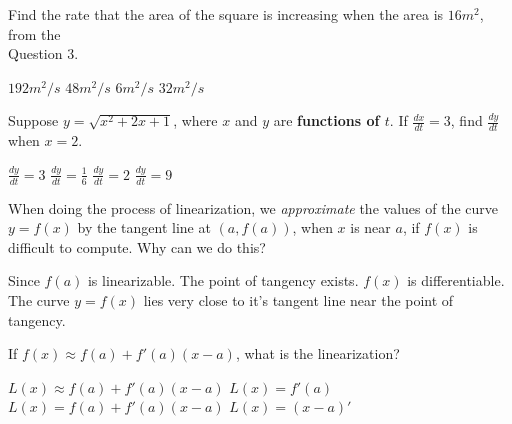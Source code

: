 \documentclass[addpoints, 12pt]{exam}%
\newcommand{\spc}{\vspace*{0.5cm}}
\begin{document}
\begin{questions}
Find the rate that the area of the square is increasing when the area is $16m^2$, from the \\Question 3.

\begin{multicols}{2}
\begin{choices}
\choice $192 m^2/s$
\CorrectChoice $48 m^2/s$
\choice $6 m^2/s$
\choice $32 m^2/s$
\end{choices}
\end{multicols}

\spc

\question[1]

Suppose $y = \sqrt{x^2 + 2x + 1}$, where $x$ and $y$ are \textbf{functions of $t$}. If $\frac{dx}{dt} = 3$, find $\frac{dy}{dt}$ when $x = 2$.

\begin{multicols}{2}
\begin{choices}
\CorrectChoice $\frac{dy}{dt} = 3$
\choice $\frac{dy}{dt} = \frac{1}{6}$
\choice $\frac{dy}{dt} = 2$
\choice $\frac{dy}{dt} = 9$
\end{choices}
\end{multicols}

\spc

\question[1]

When doing the process of linearization, we \textit{approximate} the values of the curve $y = f(x)$ by the tangent line at $(a, f(a))$, when $x$ is near $a$, if $f(x)$ is difficult to compute. Why can we do this?

\begin{choices}
\choice Since $f(a)$ is linearizable.
\choice The point of tangency exists.
\choice $f(x)$ is differentiable.
\CorrectChoice The curve $y = f(x)$ lies very close to it's tangent line near the point of tangency. 
\end{choices}

\spc

\question[1]

If $f(x) \approx f(a) + f'(a)(x-a)$, what is the linearization?

\begin{multicols}{2}
\begin{choices}
\choice $L(x) \approx f(a) + f'(a)(x-a)$
\choice $L(x) = f'(a)$
\CorrectChoice $L(x) = f(a) + f'(a)(x-a)$
\choice $L(x) = (x-a)'$
\end{choices}
\end{multicols}

\spc

\question[1]


\end{questions}
\end{document}
